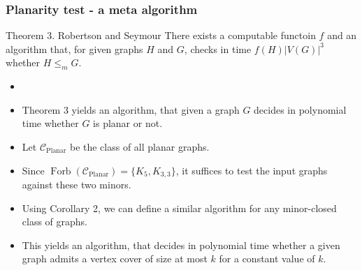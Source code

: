 \documentclass[t,usenames,dvipsnames]{beamer}
\newcommand{\cplanar}{\mathcal{C}_{\operatorname{Planar}}}
\begin{document}
\begin{frame} \frametitle{Planarity test - a meta algorithm}
	\begin{block}{Theorem 3. Robertson and Seymour}
			There exists a computable functoin $f$ and an algorithm that, for given
			graphs $H$ and $G$, checks in time $f(H)|V(G)|^3$ whether $H \leq_m G$.
	\end{block}
	\begin{itemize}[<+->]
		\item []
		\item Theorem 3 yields an algorithm, that given a graph $G$ decides in polynomial
			time whether $G$ is planar or not.
		\item Let $\cplanar$ be the class of all planar graphs.
		\item Since $\operatorname{Forb}(\cplanar) = \{K_5, K_{3,3}\}$, it suffices to test
			the input graphs against these two minors.
		\item Using Corollary 2, we can define a similar algorithm for any minor-closed
			class of graphs.
		\item This yields an algorithm, that decides in polynomial time whether a given
			graph admits a vertex cover of size at most $k$ for a constant value of
			$k$.
	\end{itemize}
\end{frame}
\end{document}
